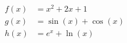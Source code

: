 
\begin{align}
    f(x) &= x^2 + 2x + 1 \label{eq:quadratica} \\
    g(x) &= \sin(x) + \cos(x) \label{eq:trigonometrica} \\
    h(x) &= e^x + \ln(x) \label{eq:exponencial}
\end{align}



